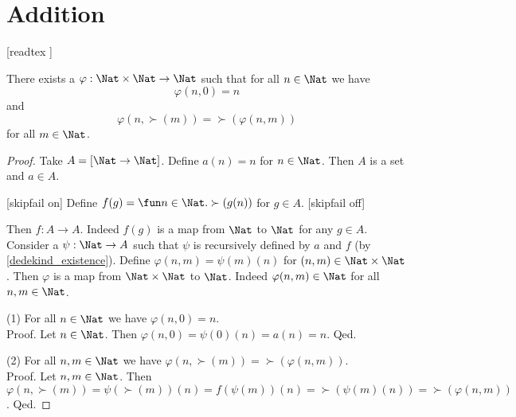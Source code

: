 \documentclass{article}
\begin{document}
  \section{Addition}\label{sec:addition}

  \begin{forthel}
    [readtex ]
  \end{forthel}

  \begin{forthel}
    \begin{lemma}\label{add_existence}
      There exists a $\varphi : \Nat \times \Nat \to \Nat$ such
      that for all $n \in \Nat$ we have
      \[\varphi(n,0) = n\]
      and
      \[\varphi(n,\succ(m)) = \succ(\varphi(n,m))\]
      for all $m \in \Nat$.
    \end{lemma}
    \begin{proof}
      Take $A = [\Nat \to \Nat]$.
      Define $a(n) = n$ for $n \in \Nat$.
      Then $A$ is a set and $a \in A$.

      [skipfail on] %
      Define $f(g) = \fun n \in \Nat. \succ(g(n))$ for $g \in A$.
      [skipfail off]

      Then $f : A \to A$.
      Indeed $f(g)$ is a map from $\Nat$ to $\Nat$ for any $g \in A$.
      Consider a $\psi : \Nat \to A$ such that $\psi$ is recursively defined by
      $a$ and $f$ (by \cref{dedekind_existence}).
      Define $\varphi(n,m) = \psi(m)(n)$ for $(n,m) \in \Nat \times \Nat$.
      Then $\varphi$ is a map from $\Nat \times \Nat$ to $\Nat$.
      Indeed $\varphi(n,m) \in \Nat$ for all $n, m \in \Nat$.

      (1) For all $n \in \Nat$ we have $\varphi(n,0) = n$. \\
      Proof.
        Let $n \in \Nat$.
        Then $\varphi(n,0)
          = \psi(0)(n)
          = a(n)
          = n$.
      Qed.

      (2) For all $n, m \in \Nat$ we have $\varphi(n, \succ(m)) =
      \succ(\varphi(n,m))$. \\
      Proof.
        Let $n, m \in \Nat$.
        Then $\varphi(n, \succ(m))
          = \psi(\succ(m))(n)
          = f(\psi(m))(n)
          = \succ(\psi(m)(n))
          = \succ(\varphi(n,m))$.
      Qed.
    \end{proof}
  \end{forthel}
\end{document}
